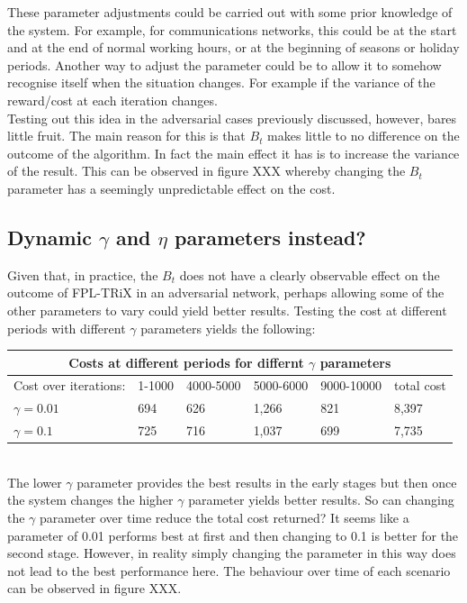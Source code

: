 These parameter adjustments could be carried out with some prior knowledge of the system. For example, for communications networks, this could be at the start and at the end of normal working hours, or at the beginning of seasons or holiday periods. Another way to adjust the parameter could be to allow it to somehow recognise itself when the situation changes. For example if the variance of the reward/cost at each iteration changes.\\

Testing out this idea in the adversarial cases previously discussed, however, bares little fruit. The main reason for this is that $B_t$ makes little to no difference on the outcome of the algorithm. In fact the main effect it has is to increase the variance of the result. This can be observed in figure XXX whereby changing the $B_t$ parameter has a seemingly unpredictable effect on the cost.\\


\subsection{Dynamic $\gamma$ and $\eta$ parameters instead?}

Given that, in practice, the $B_t$ does not have a clearly observable effect on the outcome of FPL-TRiX in an adversarial network, perhaps allowing some of the other parameters to vary could yield better results. Testing the cost at different periods with different $\gamma$ parameters yields the following:\\

\begin{tabular}{ |p{3cm}||p{1.5cm}|p{1.5cm}|p{1.5cm}|p{1.5cm}|p{1.5cm}|  }
 \hline
 \multicolumn{6}{|c|}{Costs at different periods for differnt $\gamma$ parameters}  \\
 \hline
 Cost over  iterations:& 1-1000  & 4000-5000 & 5000-6000 & 9000-10000  & total cost  \\
 \hline
 $\gamma=0.01$        & 694     & 626       & 1,266     & 821         & 8,397       \\
 $\gamma=0.1$         & 725     & 716       & 1,037     & 699         & 7,735       \\
 \hline
\end{tabular}\\

The lower $\gamma$ parameter provides the best results in the early stages but then once the system changes the higher $\gamma$ parameter yields better results. So can changing the $\gamma$ parameter over time reduce the total cost returned? It seems like a parameter of 0.01 performs best at first and then changing to 0.1 is better for the second stage. However, in reality simply changing the parameter in this way does not lead to the best performance here. The behaviour over time of each scenario can be observed in figure XXX.\\

